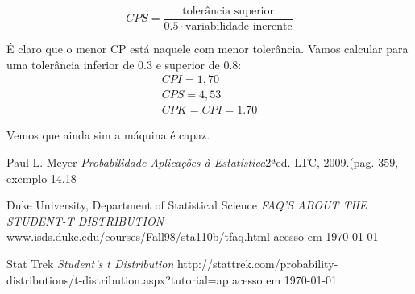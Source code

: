   \begin{equation}
 	CPS = \frac{\mbox{tolerância superior}}{0.5 \cdot \mbox{variabilidade inerente}}
 \end{equation}
 
 É claro que o menor CP está naquele com menor tolerância. Vamos calcular para uma tolerância inferior de 0.3 e superior de 0.8:
\begin{equation}
\begin{array}{l}
CPI = 1,70 \\
CPS = 4,53 \\
CPK = CPI = 1.70
\end{array}
\end{equation} 

Vemos que ainda sim a máquina é capaz.
 
 \begin{thebibliography}{1}

  		Paul L. Meyer
  		\emph{Probabilidade Aplicações à Estatística}2ªed. LTC, 2009.(pag. 359, exemplo 14.18
	
		Duke University, Department of Statistical Science  	
  		\emph{FAQ'S ABOUT THE STUDENT-T DISTRIBUTION} www.isds.duke.edu/courses/Fall98/sta110b/tfaq.html
  		acesso em \today
  		
		Stat Trek 	
  		\emph{Student's t Distribution} http://stattrek.com/probability-distributions/t-distribution.aspx?tutorial=ap
  		acesso em \today

\end{thebibliography}


